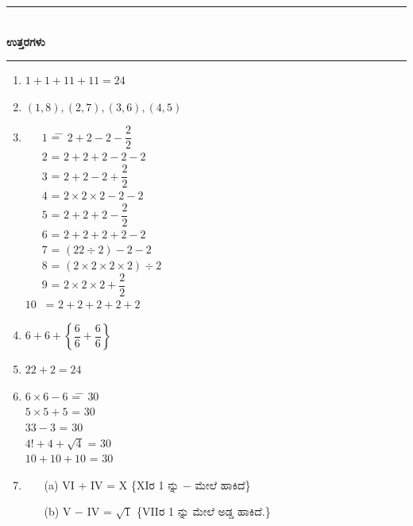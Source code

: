 \smallskip

\begin{center}
\rule{5cm}{1pt}\\[2pt]
{\Large\bfseries ಉತ್ತರಗಳು}\\[-0.1cm]
\rule{5cm}{1pt}
\end{center}


\begin{enumerate}
\itemsep=5pt

\item $1 + 1 + 11 + 11 = 24$

\smallskip
\item $(1, 8), (2, 7), (3, 6), (4, 5)$

\smallskip
\item 
\begin{tabbing}
~~~$1$ \= = \= $2 + 2 - 2 - \dfrac{2}{2}$\\[0.2cm]
~~~$2$ \> = \> $2 + 2 + 2 - 2 - 2$\\[0.2cm]
~~~$3$\> = \> $2 + 2 - 2 + \dfrac{2}{2}$\\[0.2cm]
~~~$4$ \> = \> $2 \times 2 \times 2 - 2 - 2$\\[0.2cm]
~~~$5$ \> = \> $2 + 2 + 2 - \dfrac{2}{2}$\\[0.2cm]
~~~$6$ \> = \> $2 + 2 + 2 + 2 - 2$\\[0.2cm]
~~~$7$ \> = \> $(22 \div 2) - 2 - 2$\\[0.2cm]
~~~$8$ \> = \> $(2 \times 2 \times 2 \times 2) \div 2$\\[0.2cm]
~~~$9$ \> = \> $2 \times 2 \times 2 + \dfrac{2}{2}$\\[0.2cm]
$10$~ \> = \> $2 + 2 + 2 + 2 + 2$
\end{tabbing}

\smallskip
\item $6 + 6 +\left\{\dfrac{6}{6} + \dfrac{6}{6}\right\}$

\smallskip
\item $22 + 2 = 24$

\item 
\begin{tabbing}
$6 \times 6 - 6$ \qquad\=  = \= $30$\\
$5 \times 5 + 5$ \qquad\>  = \> $30$\\
$33 - 3$ \qquad\>  = \> $30$\\
$4! + 4 + \sqrt{4}$ \> = \> $30$\\
$10 + 10 + 10$ \qquad\> = \> $30$
\end{tabbing}

\item 
\begin{itemize}
\item[(a)] VI $+$ IV = X \{XIರ 1 ನ್ನು $-$ ಮೇಲೆ ಹಾಕಿದೆ\}
\item[(b)] V $-$ IV = $\sqrt{1}$ \{VIIರ 1 ನ್ನು ಮೇಲೆ ಅಡ್ಡ ಹಾಕಿದೆ.\}
\end{itemize}


\end{enumerate}
